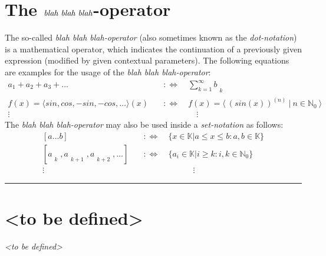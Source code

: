 \documentclass[pdftex,12pt,a4paper]{report}
\begin{document}
    \section{The $ \emph{blah blah blah} $-operator}
    The so-called \emph{blah blah blah-operator} (also sometimes known as the \emph{dot-notation}) is a mathematical operator, which indicates the continuation of a previously given expression (modified by given contextual parameters). The following equations are examples for the usage of the \emph{blah blah blah-operator}:
    \begin{equation*}
        \begin{aligned}
            a_1 + a_2 + a_3 + \ldots \quad & :\Longleftrightarrow \quad \sum_{k=1}^{ \infty } b_{\substack{\\k}}
            \\
            f(x) = \langle sin, cos, -sin, -cos, \ldots \rangle (x) \quad & :\Longleftrightarrow \quad f(x) = \langle \ (sin(x))^{(n)}\ |\ n \in \mathbb{N}_0 \ \rangle
            \\
            \vdots \qquad \qquad & \qquad \qquad \vdots
        \end{aligned}
    \end{equation*}
    The \emph{blah blah blah-operator} may also be used inside a \emph{set-notation} as follows:
    \begin{equation*}
        \begin{aligned}
            [a \ldots b] \quad & :\Longleftrightarrow \quad \{ x \in \mathbb{K} | a \leq x \leq b : a,b \in \mathbb{K} \}
            \\
            [a_{\substack{\\k}}, a_{\substack{\\k+1}}, a_{\substack{\\k+2}}, \ldots] \quad & :\Longleftrightarrow \quad \{ a_i \in \mathbb{K} | i \geq k : i,k \in \mathbb{N}_0 \}
            \\
            \vdots \quad \quad & \qquad \qquad \qquad \vdots
        \end{aligned}
    \end{equation*}
    \vspace{5mm} \hrule
    \section{<to be defined>}
    \textsl{<to be defined>}
\end{document}
